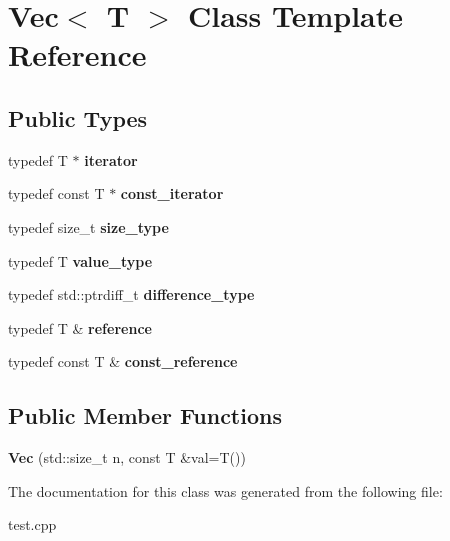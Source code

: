 \hypertarget{classVec}{}\section{Vec$<$ T $>$ Class Template Reference}
\label{classVec}
\subsection*{Public Types}
\begin{DoxyCompactItemize}
\item 
\mbox{\label{classVec_a18d486e3211b998ce0dd000d95dddbbe}} 
typedef T $\ast$ {\bfseries iterator}
\item 
\mbox{\label{classVec_a5208b137cec99b13ba74273cbdd564e4}} 
typedef const T $\ast$ {\bfseries const\+\_\+iterator}
\item 
\mbox{\label{classVec_aef386c702dd7e780c408c9cdb4cd0f40}} 
typedef size\+\_\+t {\bfseries size\+\_\+type}
\item 
\mbox{\label{classVec_a82bc529990b6ed767d347249381e6159}} 
typedef T {\bfseries value\+\_\+type}
\item 
\mbox{\label{classVec_aa84268909b9608bf2b0db35098e5cb66}} 
typedef std\+::ptrdiff\+\_\+t {\bfseries difference\+\_\+type}
\item 
\mbox{\label{classVec_a604b2b35fed38bcf9d18a51fb5a673cc}} 
typedef T \& {\bfseries reference}
\item 
\mbox{\label{classVec_a53eb22e4c8038c002212fef30490c109}} 
typedef const T \& {\bfseries const\+\_\+reference}
\end{DoxyCompactItemize}
\subsection*{Public Member Functions}
\begin{DoxyCompactItemize}
\item 
\mbox{\label{classVec_a0739f49010c6d678ad16338a8494015e}} 
{\bfseries Vec} (std\+::size\+\_\+t n, const T \&val=T())
\end{DoxyCompactItemize}


The documentation for this class was generated from the following file\+:\begin{DoxyCompactItemize}
\item 
test.\+cpp\end{DoxyCompactItemize}
